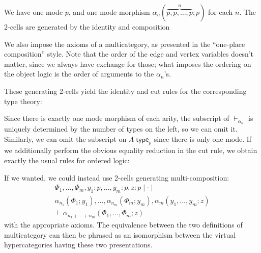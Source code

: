 \documentclass{article}
\theoremstyle{definition}
\theoremstyle{remark}
\def\type{\;\mathsf{type}}
\let\types\vdash
\begin{document}
We have one mode $p$, and one mode morphism $\alpha_n(\overbrace{p,p,\dots,p}^n;p)$ for each $n$.
The 2-cells are generated by the identity and composition
We also impose the axioms of a multicategory, as presented in the ``one-place composition'' style.
Note that the order of the edge and vertex variables doesn't matter, since we always have exchange for those; what imposes the ordering on the object logic is the order of arguments to the $\alpha_n$'s.

These generating 2-cells yield the identity and cut rules for the corresponding type theory:
Since there is exactly one mode morphism of each arity, the subscript of $\types_{\alpha_n}$ is uniquely determined by the number of types on the left, so we can omit it.
Similarly, we can omit the subscript on $A\type_p$ since there is only one mode.
If we additionally perform the obvious equality reduction in the cut rule, we obtain exactly the usual rules for ordered logic:

If we wanted, we could instead use 2-cells generating multi-composition:
\begin{multline*}
  \Phi_1,\dots,\Phi_m,y_1:p,\dots,y_m:p,z:p \mid\cdot\mid\\
  \alpha_{n_1}(\Phi_1;y_1),\dots,\alpha_{n_m}(\Phi_m;y_m), \alpha_m(y_1,\dots,y_m;z)\\
  \types \alpha_{n_1+\cdots+n_m}(\Phi_1,\dots,\Phi_m;z)
\end{multline*}
with the appropriate axioms.
The equivalence between the two definitions of multicategory can then be phrased as an isomorphism between the virtual hypercategories having these two presentations.
\end{document}
